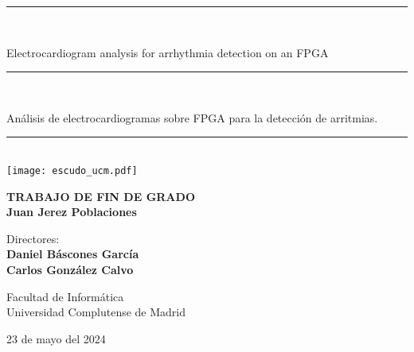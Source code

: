 \begin{titlepage}
	\thispagestyle{empty}

	\begin{center}

		\vspace{1cm}

		\vspace{0.65cm}
		\rule{2in}{0.5pt}\\
		\vspace{0.85cm}

		{\Large Electrocardiogram analysis for arrhythmia detection on an FPGA}\\

		\vspace{0.65cm}
		\rule{2in}{0.5pt}\\
		\vspace{0.85cm}

		{\Large Análisis de electrocardiogramas sobre FPGA para la detección de arritmias.}\\

		\vspace{0.65cm}
		\rule{2in}{0.5pt}\\



		\vfill
		\texttt{[image: escudo\_ucm.pdf]}
		\vfill

		

		\textbf{TRABAJO DE FIN DE GRADO}\\
		\vspace{0.7cm}
		\textbf{Juan Jerez Poblaciones}

		\vspace{1cm}

		Directores:\\
		\textbf{Daniel Báscones García}\\
		\textbf{Carlos González Calvo}

		\vspace{1.8cm}
		Facultad de Informática\\
		Universidad Complutense de Madrid
		\vspace{0.5cm}
	   
		23 de mayo del 2024

		\vspace{0.2cm}

	\end{center}
\end{titlepage}